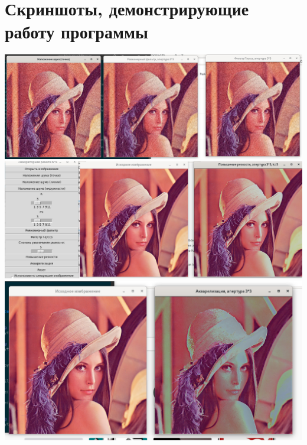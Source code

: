 \documentclass[a4paper,12pt]{article}
\begin{document}
\section{\normalsize{Скриншоты, демонстрирующие работу программы}}
\begin{flushleft}
  \includegraphics[scale=0.2]{blur.jpg}
  \includegraphics[scale=0.25]{sharpness.jpg}
  \includegraphics[scale=0.3]{watercolor.jpg}
\end{flushleft}
\end{document}
